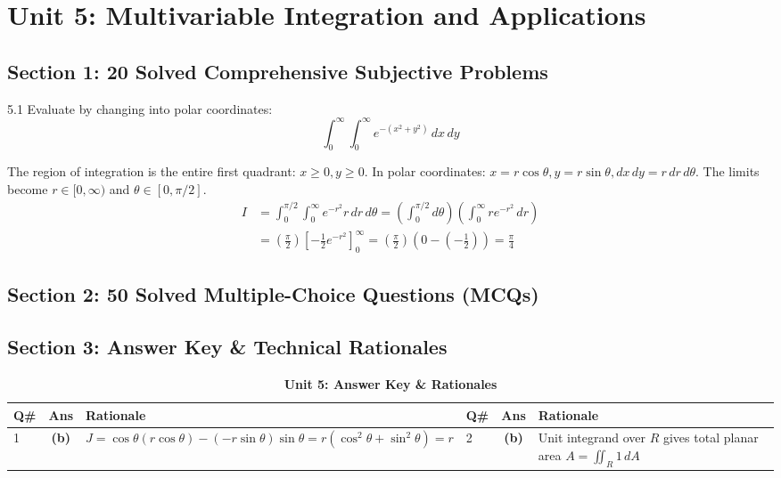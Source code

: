 \chapter{Unit 5: Multivariable Integration and Applications}

\section{Section 1: 20 Solved Comprehensive Subjective Problems}

\begin{subjectiveq}{5.1}
Evaluate by changing into polar coordinates:
\begin{equation}
\int_0^\infty \int_0^\infty e^{-(x^2+y^2)}\,dx\,dy
\end{equation}
\end{subjectiveq}

\begin{solbox}
The region of integration is the entire first quadrant: $x \ge 0, y \ge 0$.
In polar coordinates: $x = r\cos\theta, y = r\sin\theta, dx\,dy = r\,dr\,d\theta$.
The limits become $r \in [0, \infty)$ and $\theta \in [0, \pi/2]$.
\begin{align}
I &= \int_0^{\pi/2} \int_0^\infty e^{-r^2} r \, dr \, d\theta = \left( \int_0^{\pi/2} d\theta \right) \left( \int_0^\infty r e^{-r^2} \, dr \right) \\
&= \left( \frac{\pi}{2} \right) \left[ -\frac{1}{2} e^{-r^2} \right]_0^\infty = \left( \frac{\pi}{2} \right) \left( 0 - \left(-\frac{1}{2}\right) \right) = \frac{\pi}{4}
\end{align}
\end{solbox}

\section{Section 2: 50 Solved Multiple-Choice Questions (MCQs)}

\section{Section 3: Answer Key \& Technical Rationales}
\begin{table}[htbp]
\centering
\caption{\textbf{Unit 5: Answer Key \& Rationales}}
\vspace{2mm}
\begin{tabularx}{\textwidth}{l c X l c X}
\toprule
\textbf{Q\#} & \textbf{Ans} & \textbf{Rationale} & \textbf{Q\#} & \textbf{Ans} & \textbf{Rationale} \\
\midrule
1 & \textbf{(b)} & $J = \cos\theta(r\cos\theta) - (-r\sin\theta)\sin\theta = r(\cos^2\theta+\sin^2\theta)=r$ & 2 & \textbf{(b)} & Unit integrand over $R$ gives total planar area $A = \iint_R 1\,dA$ \\
\bottomrule
\end{tabularx}
\end{table}
